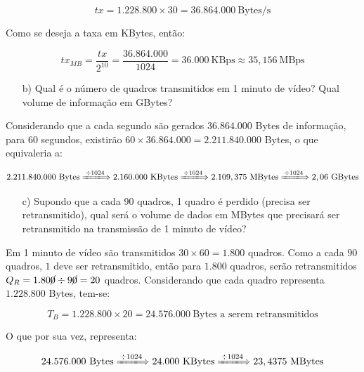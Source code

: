 \documentclass[a4paper,11pt]{article}
\begin{document}
\[
tx = 1.228.800 \times 30 = 36.864.000\ \text{Bytes/s}
\]

Como se deseja a taxa em KBytes, então:

\[
tx_{MB} = \frac{tx}{2^{10}} = \frac{36.864.000}{1024} = 36.000\ \text{KBps}
\approx 35,156\ \text{MBps}
\]

\begin{itemize}
    \item [b)] Qual é o número de quadros transmitidos em 1 minuto de vídeo?
Qual volume de informação em GBytes?
\end{itemize}

Considerando que a cada segundo são gerados $36.864.000$ Bytes de informação,
para 60 segundos, existirão $60 \times 36.864.000 = 2.211.840.000$ Bytes, o que
equivaleria a:

\[
2.211.840.000\ \text{Bytes} \xLongrightarrow{\div 1024\ }
2.160.000\ \text{KBytes} \xLongrightarrow{\div 1024\ }
2.109,375\ \text{MBytes} \xLongrightarrow{\div 1024\ }
2,06\ \text{GBytes}
\]

\begin{itemize}
    \item [c)] Supondo que a cada 90 quadros, 1 quadro é perdido (precisa ser
retransmitido), qual será o volume de dados em MBytes que precisará ser
retransmitido na transmissão de 1 minuto de vídeo?
\end{itemize}

Em 1 minuto de vídeo são transmitidos $30 \times 60 = 1.800$ quadros. Como a
cada $90$ quadros, $1$ deve ser retransmitido, então para $1.800$ quadros, serão
retransmitidos $Q_R = 1.80\cancel{0} \div 9\cancel{0} = 20$ quadros.
Considerando que cada quadro representa $1.228.800$ Bytes, tem-se:

\[
T_B = 1.228.800 \times 20 = 24.576.000\ \text{Bytes a serem
retransmitidos}
\]

O que por sua vez, representa:

\[
24.576.000\ \text{Bytes} \xLongrightarrow{\div 1024\ }
24.000\ \text{KBytes} \xLongrightarrow{\div 1024\ }
23,4375\ \text{MBytes}
\]
\end{document}
